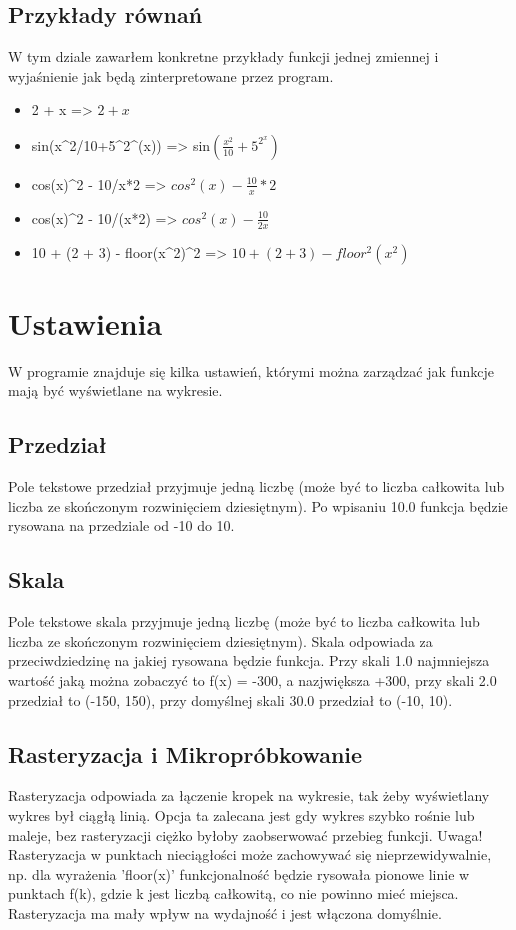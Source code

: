\documentclass[a4paper]{article}
\begin{document}
\subsection{Przykłady równań}

W tym dziale zawarłem konkretne przykłady funkcji jednej zmiennej i wyjaśnienie jak będą zinterpretowane przez program.

\begin{itemize}
    \item 2 + x => $2 + x$
    \item sin(x\^{}2/10+5\^{}2\^{}(x)) => sin$(\frac{x^2}{10} + 5^{2^x})$
    \item cos(x)\^{}2 - 10/x*2 => $cos^2 (x) - \frac{10}{x} * 2$
    \item cos(x)\^{}2 - 10/(x*2) => $cos^2 (x) - \frac{10}{2x}$
    \item 10 + (2 + 3) - floor(x\^{}2)\^{}2 => $10 + (2 + 3) - floor^2(x^2)$
\end{itemize}

\section{Ustawienia}
W programie znajduje się kilka ustawień, którymi można zarządzać jak funkcje mają być wyświetlane na wykresie.
\subsection{Przedział}
Pole tekstowe przedział przyjmuje jedną liczbę (może być to liczba całkowita lub liczba ze skończonym rozwinięciem dziesiętnym). Po wpisaniu 10.0 funkcja będzie rysowana na przedziale od -10 do 10.
\subsection{Skala}
Pole tekstowe skala przyjmuje jedną liczbę (może być to liczba całkowita lub liczba ze skończonym rozwinięciem dziesiętnym). Skala odpowiada za przeciwdziedzinę na jakiej rysowana będzie funkcja. Przy skali 1.0 najmniejsza wartość jaką można zobaczyć to f(x) = -300, a nazjwiększa +300, przy skali 2.0 przedział to (-150, 150), przy domyślnej skali 30.0 przedział to (-10, 10).
\subsection{Rasteryzacja i Mikropróbkowanie}

Rasteryzacja odpowiada za łączenie kropek na wykresie, tak żeby wyświetlany wykres był ciągłą linią. Opcja ta zalecana jest gdy wykres szybko rośnie lub maleje, bez rasteryzacji ciężko byłoby zaobserwować przebieg funkcji. 
Uwaga! Rasteryzacja w punktach nieciągłości może zachowywać się nieprzewidywalnie, np. dla wyrażenia 'floor(x)' funkcjonalność będzie rysowała pionowe linie w punktach f(k), gdzie k jest liczbą całkowitą, co nie powinno mieć miejsca.
Rasteryzacja ma mały wpływ na wydajność i jest włączona domyślnie.
\end{document}
